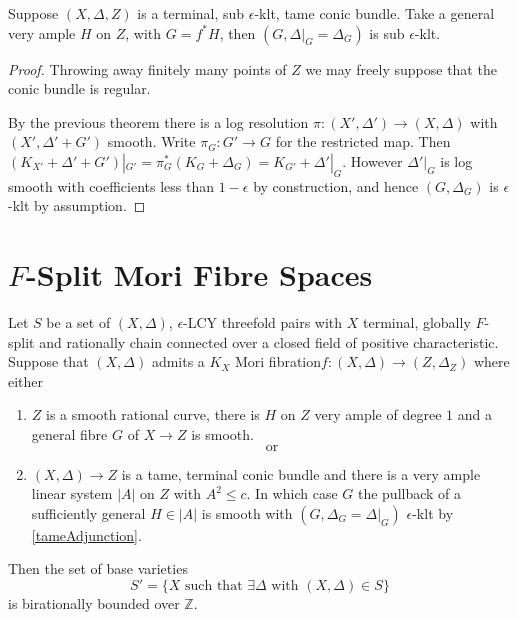 \documentclass[a4paper,12pt]{book}
\begin{document}
\begin{corollary}\label{tameAdjunction}
	Suppose $(X,\Delta,Z)$ is a terminal, sub $\epsilon$-klt, tame conic bundle. Take a general very ample $H$ on $Z$, with $G=f^{*}H$, then
	$(G,\Delta|_{G}=\Delta_{G})$ is sub $\epsilon$-klt.
\end{corollary}
\begin{proof}
	Throwing away finitely many points of $Z$ we may freely suppose that the conic bundle is regular.
	
	By the previous theorem there is a log resolution $\pi\colon (X',\Delta') \to (X,\Delta)$ with $(X',\Delta'+G')$ smooth. Write $\pi_{G}\colon G' \to G$ for the restricted map. Then $(K_{X'}+\Delta'+G')|_{G'}=\pi_{G}^{*}(K_{G}+\Delta_{G})=K_{G'}+\Delta'|_{G}$. However $\Delta'|_{G}$ is log smooth with coefficients less than $1-\epsilon$ by construction, and hence $(G,\Delta_{G})$ is $\epsilon$-klt by assumption. 
\end{proof}



\section{$F$-Split Mori Fibre Spaces}

\begin{theorem}\label{setup}
	Let $S$ be a set of $(X,\Delta)$, $\epsilon$-LCY threefold pairs with $X$ terminal, globally $F$-split and rationally chain connected over a closed field of positive characteristic. Suppose that $(X,\Delta)$ admits a $K_{X}$ Mori fibration$f\colon (X,\Delta) \to (Z,\Delta_{Z})$ where either
	\begin{enumerate}
		\item $Z$ is a smooth rational curve, there is $H$ on $Z$ very ample of degree $1$ and a general fibre $G$ of $X \to Z$ is smooth.\\
		\[\text{or}\]
		\item $(X,\Delta) \to Z$ is a tame, terminal conic bundle and there is a very ample linear system $|A|$ on $Z$  with $A^{2} \leq c$. In which case $G$ the pullback of a sufficiently general $H \in |A|$ is smooth with $(G,\Delta_{G}=\Delta|_{G})$ $\epsilon$-klt by \autoref{tameAdjunction}.
	\end{enumerate}
	Then the set of base varieties $$S'=\{X \text{ such that } \exists \Delta \text{ with } (X,\Delta) \in S\}$$ is birationally bounded over $\mathbb{Z}$. 
\end{theorem}
\end{document}
